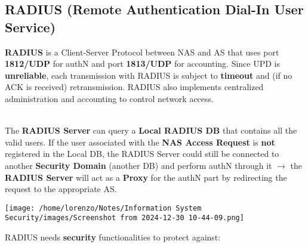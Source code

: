 \subsection{RADIUS (Remote Authentication Dial-In User Service)}
\textbf{RADIUS} is a Client-Server Protocol between NAS and AS that uses port \textbf{1812/UDP} for
authN and port \textbf{1813/UDP} for accounting. Since UPD is \textbf{unreliable}, each transmission with RADIUS is subject to \textbf{timeout} and (if no ACK is received) retransmission. RADIUS also implements centralized administration and accounting to control network access.\\
\\
\begin{minipage}{0.5\textwidth}
	\vspace{-0.8cm}
The \textbf{RADIUS Server} can query a \textbf{Local RADIUS DB} that contains all the valid users.
If the user associated with the \textbf{NAS Access Request} is \textbf{not} registered in the Local DB,
the RADIUS Server could still be connected to another \textbf{Security Domain} (another DB) and perform authN through it \(\rightarrow \) the \textbf{RADIUS Server} will act as a \textbf{Proxy} for the authN part by redirecting the request to the appropriate AS. 
\end{minipage} 
\hspace{0.0cm}
\begin{minipage}{0.5\textwidth}
    \centering
    \texttt{[image: /home/lorenzo/Notes/Information System Security/images/Screenshot from 2024-12-30 10-44-09.png]}
\end{minipage}
RADIUS needs \textbf{security} functionalities to protect against:
